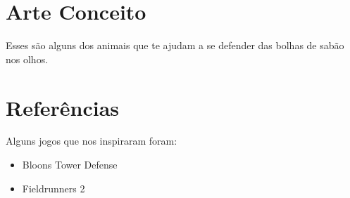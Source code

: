 \documentclass[a4paper,draft,12pt]{article}
\newcounter{tbsnr}
\newenvironment{tbs}
{\addtocounter{tbsnr}{1}\par\bigskip \noindent\fbox{\thetbsnr}
\hspace*{\fill}\begin{minipage}{10cm}\tt}
{\end{minipage}\hspace*{\fill}\bigskip}
\newcommand{\tb}[1]{\begin{tbs}{#1}\end{tbs}}
\newcounter{Def}
\begin{document}
\section{Arte Conceito}

\vspace{8cm}
Esses são alguns dos animais que te ajudam a se defender das bolhas de sabão nos olhos.
\section{Referências}
Alguns jogos que nos inspiraram foram:

\begin{itemize}
\vspace{8cm}
\item[] Bloons Tower Defense
\vspace{8cm}
\item[] Fieldrunners 2
\end{itemize}





\end{document}
